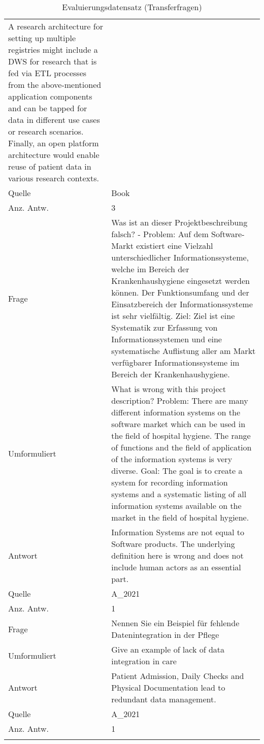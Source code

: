 \begin{landscape}
\begin{longtable}{p{3cm}p{}}
    A research architecture for setting up multiple registries might include a DWS for research that is fed via ETL processes from the above-mentioned application components and can be tapped for data in different use cases or research scenarios.
    Finally, an open platform architecture would enable reuse of patient data in various research contexts.\\
    Quelle & Book \\
    Anz. Antw. & 3 \\
    \midrule
    Frage & Was ist an dieser Projektbeschreibung falsch?
                - Problem: Auf dem Software-Markt existiert eine Vielzahl unterschiedlicher Informationssysteme, welche im Bereich der Krankenhaushygiene eingesetzt werden können.
    Der Funktionsumfang und der Einsatzbereich der Informationssysteme ist sehr vielfältig.
                Ziel: Ziel ist eine Systematik zur Erfassung von Informationssystemen und eine systematische Auflistung aller am Markt verfügbarer Informationssysteme im Bereich der Krankenhaushygiene.\\
    Umformuliert & What is wrong with this project description?
    Problem: There are many different information systems on the software market which can be used in the field of hospital hygiene.
    The range of functions and the field of application of the information systems is very diverse.
    Goal: The goal is to create a system for recording information systems and a systematic listing of all information systems available on the market in the field of hospital hygiene.\\
    Antwort & Information Systems are not equal to Software products.
    The underlying definition here is wrong and does not include human actors as an essential part.\\
    Quelle & A\_2021 \\
    Anz. Antw. & 1 \\
    \midrule
    Frage & Nennen Sie ein Beispiel für fehlende Datenintegration in der Pflege \\
    Umformuliert & Give an example of lack of data integration in care \\
    Antwort & Patient Admission, Daily Checks and Physical Documentation lead to redundant data management.\\
    Quelle & A\_2021 \\
    Anz. Antw. & 1 \\
    \bottomrule
    \caption*{Evaluierungsdatensatz (Transferfragen)}\label{tab:evaldata-transfer}
\end{longtable}
\end{landscape}
